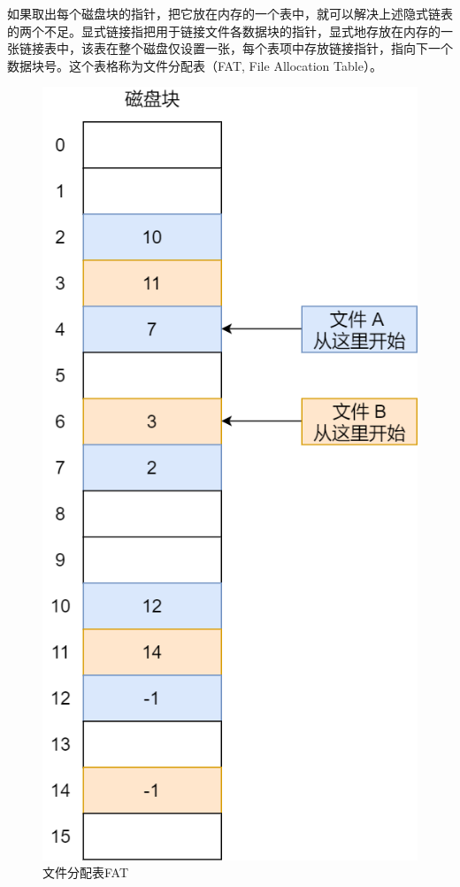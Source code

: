 如果取出每个磁盘块的指针，把它放在内存的一个表中，就可以解决上述隐式链表的两个不足。显式链接指把用于链接文件各数据块的指针，显式地存放在内存的一张链接表中，该表在整个磁盘仅设置一张，每个表项中存放链接指针，指向下一个数据块号。这个表格称为文件分配表（FAT, File Allocation Table）。

\begin{figure}[H]
	\centering
	\includegraphics[scale=0.4]{img/C5/5-4/4.png}
	\caption{文件分配表FAT}
\end{figure}

